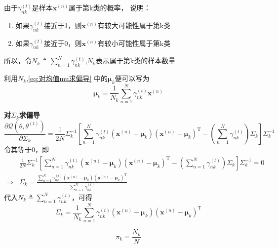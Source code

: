 \documentclass[withoutpreface,bwprint]{NoteBook}
\begin{document}
由于$\gamma_{nk}^{(t)}$是样本$\mathbf{x}^{(n)}$属于第k类的概率，
说明：
\begin{enumerate}
    \item 如果$\gamma_{nk}^{(t)}$接近于1，则$\mathbf{x}^{(n)}$有较大可能性属于第k类
    \item 如果$\gamma_{nk}^{(t)}$接近于0，则$\mathbf{x}^{(n)}$有较小可能性属于第k类
\end{enumerate}
所以，令$N_k \triangleq \sum_{n=1}^N \gamma_{nk}^{(t)}$,\quad $N_k$表示属于第k类的样本数量

利用$N_k$,\cref{eq:对均值mu求偏导} 中的$\bm{\mu}_k $便可以写为
\begin{equation}
    \label{eq:GMM中均值mu的公式}
    \bm{\mu}_k = \frac{1}{N_k} \sum_{n=1}^N \gamma_{nk}^{(t)} \mathbf{x}^{(n)}
\end{equation}

\textbf{对$\Sigma_k$求偏导}
\begin{equation}
    \label{eq:对协方差矩阵Sigma求偏导} 
    \frac{\partial \mathcal{Q}(\theta,\theta^{(t)})}{\partial \Sigma_k}
     = \frac{1}{2N} \Sigma_k^{-1} \left[ \sum_{n=1}^N \gamma_{nk}^{(t)} \left(\mathbf{x}^{(n)}-\bm{\mu}_k \right) \left(\mathbf{x}^{(n)}-\bm{\mu}_k \right)^\mathrm{T} - \left( \sum_{n=1}^N \gamma_{nk}^{(t)} \right) \Sigma_k \right] \Sigma_k^{-1}
\end{equation}
令其等于0，即
\begin{align}
    \label{eq:对协方差矩阵Sigma求偏导后化简} 
    & \frac{1}{2N} \Sigma_k^{-1} \left[ \sum_{n=1}^N \gamma_{nk}^{(t)} \left(\mathbf{x}^{(n)}-\bm{\mu}_k \right) \left(\mathbf{x}^{(n)}-\bm{\mu}_k \right)^\mathrm{T} - \left( \sum_{n=1}^N \gamma_{nk}^{(t)} \right) \Sigma_k \right] \Sigma_k^{-1} = 0 \nonumber \\
    \Rightarrow & \Sigma_k = \frac{ \sum_{n=1}^N \gamma_{nk}^{(t)} \left(\mathbf{x}^{(n)}-\bm{\mu}_k \right) \left(\mathbf{x}^{(n)}-\bm{\mu}_k \right)^\mathrm{T} }{\sum_{n=1}^{N} \gamma_{nk}^{(t)}}
\end{align}
代入$N_k \triangleq \sum_{n=1}^N \gamma_{nk}^{(t)}$，可得
\begin{equation}
    \label{eq:GMM中协方差矩阵Sigma的公式}
    \Sigma_k = \frac{1}{N_k} \sum_{n=1}^N \gamma_{nk}^{(t)} \left(\mathbf{x}^{(n)}-\bm{\mu}_k \right) \left(\mathbf{x}^{(n)}-\bm{\mu}_k \right)^\mathrm{T}
\end{equation}

\begin{equation}
    \label{eq:GMM中权重pi的公式}
    \pi_k = \frac{N_k}{N}
\end{equation}
\end{document}
